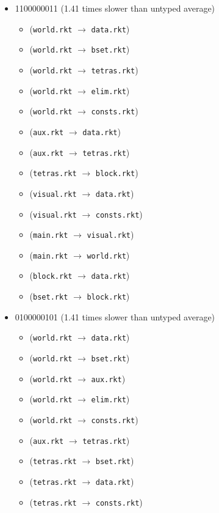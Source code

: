 \documentclass{article}
\newcommand{\mono}[1]{\texttt{#1}}
\begin{document}
\begin{itemize}
\item 1100000011 (1.41 times slower than untyped average)
  \begin{itemize}
  \item (\mono{world.rkt} $\rightarrow$ \mono{data.rkt})
  \item (\mono{world.rkt} $\rightarrow$ \mono{bset.rkt})
  \item (\mono{world.rkt} $\rightarrow$ \mono{tetras.rkt})
  \item (\mono{world.rkt} $\rightarrow$ \mono{elim.rkt})
  \item (\mono{world.rkt} $\rightarrow$ \mono{consts.rkt})
  \item (\mono{aux.rkt} $\rightarrow$ \mono{data.rkt})
  \item (\mono{aux.rkt} $\rightarrow$ \mono{tetras.rkt})
  \item (\mono{tetras.rkt} $\rightarrow$ \mono{block.rkt})
  \item (\mono{visual.rkt} $\rightarrow$ \mono{data.rkt})
  \item (\mono{visual.rkt} $\rightarrow$ \mono{consts.rkt})
  \item (\mono{main.rkt} $\rightarrow$ \mono{visual.rkt})
  \item (\mono{main.rkt} $\rightarrow$ \mono{world.rkt})
  \item (\mono{block.rkt} $\rightarrow$ \mono{data.rkt})
  \item (\mono{bset.rkt} $\rightarrow$ \mono{block.rkt})
  \end{itemize}
\item 0100000101 (1.41 times slower than untyped average)
  \begin{itemize}
  \item (\mono{world.rkt} $\rightarrow$ \mono{data.rkt})
  \item (\mono{world.rkt} $\rightarrow$ \mono{bset.rkt})
  \item (\mono{world.rkt} $\rightarrow$ \mono{aux.rkt})
  \item (\mono{world.rkt} $\rightarrow$ \mono{elim.rkt})
  \item (\mono{world.rkt} $\rightarrow$ \mono{consts.rkt})
  \item (\mono{aux.rkt} $\rightarrow$ \mono{tetras.rkt})
  \item (\mono{tetras.rkt} $\rightarrow$ \mono{bset.rkt})
  \item (\mono{tetras.rkt} $\rightarrow$ \mono{data.rkt})
  \item (\mono{tetras.rkt} $\rightarrow$ \mono{consts.rkt})

\end{itemize}
\end{itemize}
\end{document}
